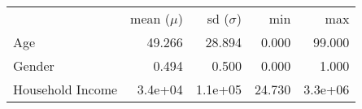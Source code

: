 \begin{tabular}{lrrrr} 
\hline \hline  & mean ($\mu$) & sd ($\sigma$) & min & max \\
Age &  49.266 &  28.894 &   0.000 &  99.000 \\
Gender &   0.494 &   0.500 &   0.000 &   1.000 \\
Household Income &  3.4e+04 &  1.1e+05 &  24.730 &  3.3e+06 \\
\hline \hline \end{tabular}
